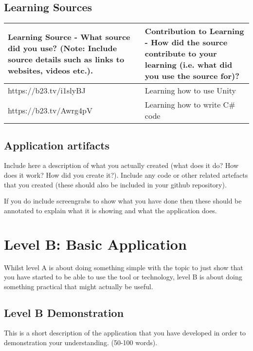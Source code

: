 \documentclass[a4paper, 11pt]{report}
\begin{document}
\subsection{Learning Sources}


\begin{tabular}{|p{}|p{}|}
	\hline
	Learning Source - What source did you use? (Note: Include source details such as links to websites, videos etc.). & Contribution to Learning - How did the source contribute to your learning (i.e. what did you use the source for)?\\
	\hline
	https://b23.tv/i1slyBJ & Learning how to use Unity\\
	\hline
	https://b23.tv/Awrg4pV & Learning how to write C# code\\
\end{tabular}

\subsection{Application artifacts}
Include here a description of what you actually created (what does it do? How does it work? How did you create it?). Include any code or other related artefacts that you created (these should also be included in your github repository).

If you do include screengrabs to show what you have done then these should be annotated to explain what it is showing and what the application does.



\newpage
\section{Level B: Basic Application}

Whilst level A is about doing something simple with the topic to just show that you have started to be able to use the tool or technology, level B is about doing something practical that might actually be useful.

\subsection{Level B Demonstration}

This is a short description of the application that you have developed in order to demonstration your understanding. (50-100 words).
\end{document}
